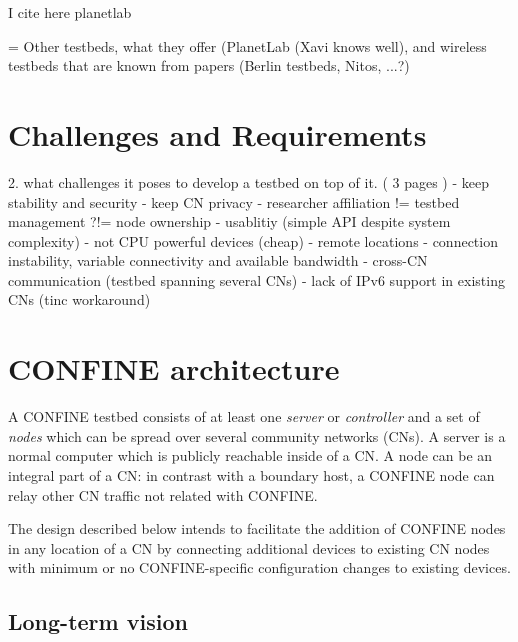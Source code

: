 \documentclass[conference]{IEEEtran}
\begin{document}
I cite here planetlab \cite{planetlab}

= Other testbeds, what they offer (PlanetLab (Xavi knows well), and wireless
testbeds that are known from papers (Berlin testbeds, Nitos, ...?)


\section{Challenges and Requirements}


2. what challenges it poses to develop a testbed on top of it. ( 3 pages )
  - keep stability and security
  - keep CN privacy
  - researcher affiliation != testbed management ?!= node ownership
  - usablitiy (simple API despite system complexity)
  - not CPU powerful devices (cheap)
  - remote locations
  - connection instability, variable connectivity and available bandwidth
  - cross-CN communication (testbed spanning several CNs)
  - lack of IPv6 support in existing CNs (tinc workaround)

\section{CONFINE architecture}

A CONFINE testbed consists of at least one \emph{server} or \emph{controller}
and a set of \emph{nodes} which can be spread over several community networks
(CNs).  A server is a normal computer which is publicly reachable inside of a
CN.  A node can be an integral part of a CN: in contrast with a boundary host,
a CONFINE node can relay other CN traffic not related with CONFINE.

The design described below intends to facilitate the addition of CONFINE nodes
in any location of a CN by connecting additional devices to existing CN nodes
with minimum or no CONFINE-specific configuration changes to existing devices.

\subsection{Long-term vision}
\end{document}
